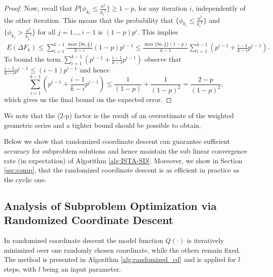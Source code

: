 \documentclass[11pt]{article}
\numberwithin{equation}{section}
\begin{document}
\begin{proof}
	Now, recall that  $P\{\phi_{k_i} \leq \frac{a^2}{{k_i}^2}\}\geq 1-p$, for any iteration $i$, independently of the other iteration. 
	This means that the probability that 
	$\{\phi_{k_i} \leq \frac{a^2}{{k_i}^2}\}$ and $\{\phi_{k_j} > \frac{a^2}{{k_j}^2}\}$ for all $j=1\ldots, i-1$ is $(1-p)p^i$. 
	  This implies
		\begin{align}\label{eq:finalsum}
	    E(\Delta F_{k }) \leq  \sum_{i=1}^{k-1}  \frac{\max\{ba, \frac{1}{c}\}}{k-i}(1-p)p^{i-1}\leq\frac{ \max\{ba, \frac{1}{c}\}(1-p)}{k-1} 
	    \sum_{i=1}^{k-1} ( p^{i-1}+\frac{i-1}{k-i}p^{i-1}).
	\end{align}
	To bound the term $\sum_{i=1}^{k-1} ( p^{i-1}+\frac{i-1}{k-i}p^{i-1})$ observe that $\frac{i-1}{k-i}p^{i-1}\leq (i-1)p^{i-1}$ and hence
	\[
	\sum_{i=1}^{k-1} ( p^{i-1}+\frac{i-1}{k-i}p^{i-1})\leq \frac{1}{(1-p)}+\frac{1}{(1-p)^2}= \frac{2-p}{(1-p)^2},
	\]
which gives us the final bound on the expected error. 
\end{proof}

We note that the (2-p) factor  is the result of an overestimate of the weighted geometric series and a tighter bound should be possible to obtain. 



Below we show that randomized coordinate descent can guarantee sufficient accuracy for subproblem solutions and hence maintain the sub linear convergence rate (in expectation) of Algorithm \ref{alg:ISTA-SD}. Moreover, we show in Section \ref{sec:comp}, that the randomized coordinate descent is as efficient in practice as the cyclic one. 




\subsection{Analysis of Subproblem Optimization via Randomized Coordinate Descent} %
\label{sec:coordinate_descent_iteration_complexity}
In randomized coordinate descent the model function $Q(\cdot)$ is iteratively minimized over one randomly chosen coordinate, while the others remain fixed. 
The method  is presented in Algorithm \ref{alg:randomized_cd} and is applied for $l$ steps, with $l$ being an input parameter. 
\end{document}
